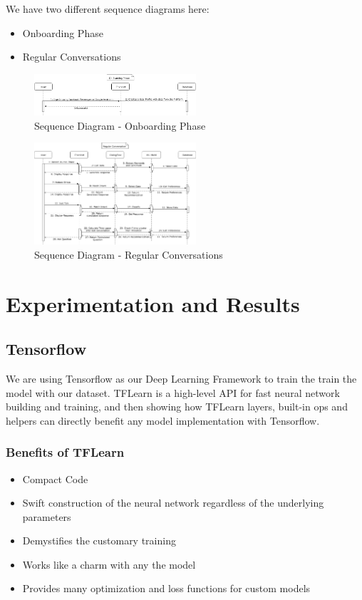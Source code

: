 \documentclass[conference,compsoc]{IEEEtran}
\begin{document}
We have two different sequence diagrams here:
\begin{itemize}
    \item Onboarding Phase
    \item Regular Conversations
\end{itemize}

\begin{figure}[H]
    \centering
    \includegraphics[width=6cm]{images/sequence-diagram-onboarding-phase.png}
    \caption{Sequence Diagram - Onboarding Phase}
\end{figure}

\begin{figure}[H]
    \centering
    \includegraphics[width=6cm]{images/sequence-diagram-regular-conversations.png}
    \caption{Sequence Diagram - Regular Conversations}
\end{figure}


\section{Experimentation and Results}


\subsection{Tensorflow}

We are using Tensorflow as our Deep Learning Framework to train the train the model with our dataset. TFLearn is a high-level API for fast neural network building and training, and then showing how TFLearn layers, built-in ops and helpers can directly benefit any model implementation with Tensorflow. 

\subsubsection{Benefits of TFLearn}
\begin{itemize}
    \item Compact Code
    \item Swift construction of the neural network regardless of the underlying parameters 
    \item Demystifies the customary training
    \item Works like a charm with any the model
    \item Provides many optimization and loss functions for custom models
\end{itemize}
\end{document}
